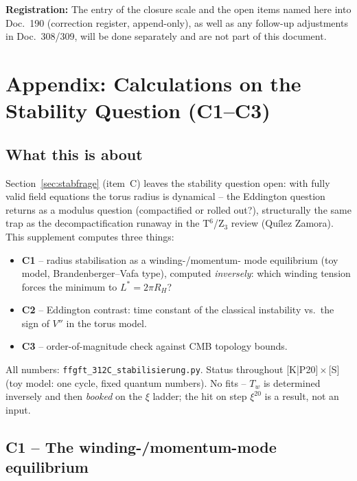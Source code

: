 \documentclass[11pt]{report}
\begin{document}
\medskip
\noindent\textbf{Registration:} The entry of the closure scale and
the open items named here into Doc.~190 (correction register,
append-only), as well as any follow-up adjustments in Doc.~308/309,
will be done separately and are not part of this document.


\appendix
\chapter{Appendix: Calculations on the Stability Question (C1--C3)}
\label{app:stab}

\section*{What this is about}

Section~\ref{sec:stabfrage} (item~C) leaves the stability question open: with
fully valid field equations the torus radius is dynamical -- the
Eddington question returns as a modulus question (compactified or
rolled out?), structurally the same trap as the decompactification
runaway in the T$^6$/Z$_3$ review (Quílez Zamora). This supplement
computes three things:

\begin{itemize}
  \item \textbf{C1} -- radius stabilisation as a winding-/momentum-%
        mode equilibrium (toy model, Brandenberger--Vafa type),
        computed \emph{inversely}: which winding tension forces the
        minimum to $L^{*} = 2\pi R_H$?
  \item \textbf{C2} -- Eddington contrast: time constant of the
        classical instability vs.\ the sign of $V''$ in the torus
        model.
  \item \textbf{C3} -- order-of-magnitude check against CMB topology
        bounds.
\end{itemize}

All numbers: \texttt{ffgft\_312C\_stabilisierung.py}. Status
throughout [K|P20]\,$\times$\,[S] (toy model: one cycle, fixed
quantum numbers). No fits -- $T_w$ is determined inversely and then
\emph{booked} on the $\xi$ ladder; the hit on step $\xi^{20}$ is a
result, not an input.

\section{C1 -- The winding-/momentum-mode equilibrium}
\end{document}
